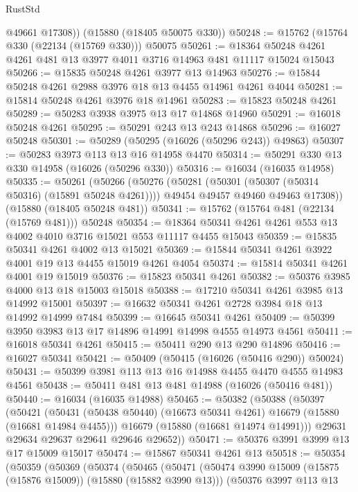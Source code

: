 \begin{lexlean}{RustStd}
\begin{coremodule}
        @49661
        @17308))
    (@15880 (@18405 @50075 @330))
@50248 := @15762 (@15764 @330 (@22134 (@15769 @330))) @50075
@50261 := @18364 @50248 @4261 @4261 @481 @13 @3977 @4011 @3716 @14963 @481 @11117 @15024 @15043
@50266 := @15835 @50248 @4261 @3977 @13 @14963
@50276 := @15844 @50248 @4261 @2988 @3976 @18 @13 @4455 @14961 @4261 @4044
@50281 := @15814 @50248 @4261 @3976 @18 @14961
@50283 := @15823 @50248 @4261
@50289 := @50283 @3938 @3975 @13 @17 @14868 @14960
@50291 := @16018 @50248 @4261
@50295 := @50291 @243 @13 @243 @14868
@50296 := @16027 @50248
@50301 := @50289 (@50295 (@16026 (@50296 @243)) @49863)
@50307 := @50283 @3973 @113 @13 @16 @14958 @4470
@50314 := @50291 @330 @13 @330 @14958 (@16026 (@50296 @330))
@50316 := @16034 (@16035 @14958)
@50335 := @50261
    (@50266
      (@50276
        (@50281 (@50301 (@50307 (@50314 @50316) (@15891 @50248 @4261))))
        @49454
        @49457
        @49460
        @49463
        @17308))
    (@15880 (@18405 @50248 @481))
@50341 := @15762 (@15764 @481 (@22134 (@15769 @481))) @50248
@50354 := @18364 @50341 @4261 @4261 @553 @13 @4002 @4010 @3716 @15021 @553 @11117 @4455 @15043
@50359 := @15835 @50341 @4261 @4002 @13 @15021
@50369 := @15844 @50341 @4261 @3922 @4001 @19 @13 @4455 @15019 @4261 @4054
@50374 := @15814 @50341 @4261 @4001 @19 @15019
@50376 := @15823 @50341 @4261
@50382 := @50376 @3985 @4000 @13 @18 @15003 @15018
@50388 := @17210 @50341 @4261 @3985 @13 @14992 @15001
@50397 := @16632 @50341 @4261 @2728 @3984 @18 @13 @14992 @14999 @7484
@50399 := @16645 @50341 @4261
@50409 := @50399 @3950 @3983 @13 @17 @14896 @14991 @14998 @4555 @14973 @4561
@50411 := @16018 @50341 @4261
@50415 := @50411 @290 @13 @290 @14896
@50416 := @16027 @50341
@50421 := @50409 (@50415 (@16026 (@50416 @290)) @50024)
@50431 := @50399 @3981 @113 @13 @16 @14988 @4455 @4470 @4555 @14983 @4561
@50438 := @50411 @481 @13 @481 @14988 (@16026 (@50416 @481))
@50440 := @16034 (@16035 @14988)
@50465 := @50382
    (@50388
      (@50397
        (@50421
          (@50431 (@50438 @50440) (@16673 @50341 @4261) @16679 (@15880 (@16681 @14984 @4455)))
          @16679
          (@15880 (@16681 @14974 @14991)))
        @29631
        @29634
        @29637
        @29641
        @29646
        @29652))
@50471 := @50376 @3991 @3999 @13 @17 @15009 @15017
@50474 := @15867 @50341 @4261 @13
@50518 := @50354
    (@50359
      (@50369
        (@50374
          (@50465
            (@50471
              (@50474 @3990 @15009 (@15875 (@15876 @15009)) (@15880 (@15882 @3990 @13)))
              (@50376
                @3997
                @113
                @13

\end{coremodule}
\end{lexlean}
